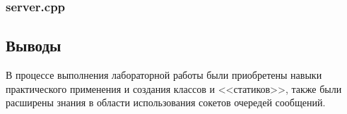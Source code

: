 \documentclass[12pt]{article}
\begin{document}
	
	
	\subsubsection*{server.cpp}
	
	
	
	\subsection*{Выводы}
	
	В процессе выполнения лабораторной работы были приобретены навыки практического применения и создания классов и <<статиков>>, также были расширены знания в области использования сокетов очередей сообщений.
	
\end{document}
